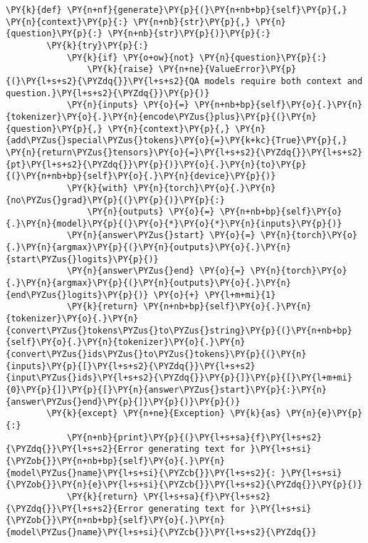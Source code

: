 \documentclass[11pt]{wseas}
\begin{document}
\begin{tcolorbox}[breakable, size=fbox, boxrule=1pt, pad at break*=1mm,colback=cellbackground, colframe=cellborder]
\begin{Verbatim}[commandchars=\\\{\}]
    \PY{k}{def} \PY{n+nf}{generate}\PY{p}{(}\PY{n+nb+bp}{self}\PY{p}{,} \PY{n}{context}\PY{p}{:} \PY{n+nb}{str}\PY{p}{,} \PY{n}{question}\PY{p}{:} \PY{n+nb}{str}\PY{p}{)}\PY{p}{:}
        \PY{k}{try}\PY{p}{:}
            \PY{k}{if} \PY{o+ow}{not} \PY{n}{question}\PY{p}{:}
                \PY{k}{raise} \PY{n+ne}{ValueError}\PY{p}{(}\PY{l+s+s2}{\PYZdq{}}\PY{l+s+s2}{QA models require both context and question.}\PY{l+s+s2}{\PYZdq{}}\PY{p}{)}
            \PY{n}{inputs} \PY{o}{=} \PY{n+nb+bp}{self}\PY{o}{.}\PY{n}{tokenizer}\PY{o}{.}\PY{n}{encode\PYZus{}plus}\PY{p}{(}\PY{n}{question}\PY{p}{,} \PY{n}{context}\PY{p}{,} \PY{n}{add\PYZus{}special\PYZus{}tokens}\PY{o}{=}\PY{k+kc}{True}\PY{p}{,} \PY{n}{return\PYZus{}tensors}\PY{o}{=}\PY{l+s+s2}{\PYZdq{}}\PY{l+s+s2}{pt}\PY{l+s+s2}{\PYZdq{}}\PY{p}{)}\PY{o}{.}\PY{n}{to}\PY{p}{(}\PY{n+nb+bp}{self}\PY{o}{.}\PY{n}{device}\PY{p}{)}
            \PY{k}{with} \PY{n}{torch}\PY{o}{.}\PY{n}{no\PYZus{}grad}\PY{p}{(}\PY{p}{)}\PY{p}{:}
                \PY{n}{outputs} \PY{o}{=} \PY{n+nb+bp}{self}\PY{o}{.}\PY{n}{model}\PY{p}{(}\PY{o}{*}\PY{o}{*}\PY{n}{inputs}\PY{p}{)}
            \PY{n}{answer\PYZus{}start} \PY{o}{=} \PY{n}{torch}\PY{o}{.}\PY{n}{argmax}\PY{p}{(}\PY{n}{outputs}\PY{o}{.}\PY{n}{start\PYZus{}logits}\PY{p}{)}
            \PY{n}{answer\PYZus{}end} \PY{o}{=} \PY{n}{torch}\PY{o}{.}\PY{n}{argmax}\PY{p}{(}\PY{n}{outputs}\PY{o}{.}\PY{n}{end\PYZus{}logits}\PY{p}{)} \PY{o}{+} \PY{l+m+mi}{1}
            \PY{k}{return} \PY{n+nb+bp}{self}\PY{o}{.}\PY{n}{tokenizer}\PY{o}{.}\PY{n}{convert\PYZus{}tokens\PYZus{}to\PYZus{}string}\PY{p}{(}\PY{n+nb+bp}{self}\PY{o}{.}\PY{n}{tokenizer}\PY{o}{.}\PY{n}{convert\PYZus{}ids\PYZus{}to\PYZus{}tokens}\PY{p}{(}\PY{n}{inputs}\PY{p}{[}\PY{l+s+s2}{\PYZdq{}}\PY{l+s+s2}{input\PYZus{}ids}\PY{l+s+s2}{\PYZdq{}}\PY{p}{]}\PY{p}{[}\PY{l+m+mi}{0}\PY{p}{]}\PY{p}{[}\PY{n}{answer\PYZus{}start}\PY{p}{:}\PY{n}{answer\PYZus{}end}\PY{p}{]}\PY{p}{)}\PY{p}{)}
        \PY{k}{except} \PY{n+ne}{Exception} \PY{k}{as} \PY{n}{e}\PY{p}{:}
            \PY{n+nb}{print}\PY{p}{(}\PY{l+s+sa}{f}\PY{l+s+s2}{\PYZdq{}}\PY{l+s+s2}{Error generating text for }\PY{l+s+si}{\PYZob{}}\PY{n+nb+bp}{self}\PY{o}{.}\PY{n}{model\PYZus{}name}\PY{l+s+si}{\PYZcb{}}\PY{l+s+s2}{: }\PY{l+s+si}{\PYZob{}}\PY{n}{e}\PY{l+s+si}{\PYZcb{}}\PY{l+s+s2}{\PYZdq{}}\PY{p}{)}
            \PY{k}{return} \PY{l+s+sa}{f}\PY{l+s+s2}{\PYZdq{}}\PY{l+s+s2}{Error generating text for }\PY{l+s+si}{\PYZob{}}\PY{n+nb+bp}{self}\PY{o}{.}\PY{n}{model\PYZus{}name}\PY{l+s+si}{\PYZcb{}}\PY{l+s+s2}{\PYZdq{}}


\end{Verbatim}
\end{tcolorbox}
\end{document}
